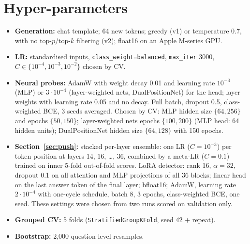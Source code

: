 \documentclass[11pt]{article}
\begin{document}
\section{Hyper-parameters}
\begin{itemize}
  \item \textbf{Generation:} chat template; 64 new tokens; greedy (v1) or temperature 0.7, with no top-$p$/top-$k$ filtering (v2); float16 on an Apple M-series GPU.
  \item \textbf{LR:} standardised inputs, \texttt{class\_weight=balanced}, \texttt{max\_iter} 3000, $C \in \{10^{-4},10^{-3},10^{-2}\}$ chosen by CV.
  \item \textbf{Neural probes:} AdamW with weight decay 0.01 and learning rate $10^{-3}$ (MLP) or $3\cdot10^{-4}$ (layer-weighted nets, DualPositionNet) for the head; layer weights with learning rate 0.05 and no decay. Full batch, dropout 0.5, class-weighted BCE, 3 seeds averaged. Chosen by CV: MLP hidden size $\{64,256\}$ and epochs $\{50,150\}$; layer-weighted nets epochs $\{100,200\}$ (MLP head: 64 hidden units); DualPositionNet hidden size $\{64,128\}$ with 150 epochs.
  \item \textbf{Section~\ref{sec:push}:} stacked per-layer ensemble: one LR ($C=10^{-3}$) per token position at layers 14, 16, \dots, 36, combined by a meta-LR ($C=0.1$) trained on inner 5-fold out-of-fold scores. LoRA detector: rank 16, $\alpha=32$, dropout 0.1 on all attention and MLP projections of all 36 blocks; linear head on the last answer token of the final layer; bfloat16; AdamW, learning rate $2\cdot10^{-4}$ with one-cycle schedule, batch 8, 3 epochs, class-weighted BCE, one seed. These settings were chosen from two runs scored on validation only.
  \item \textbf{Grouped CV:} 5 folds (\texttt{StratifiedGroupKFold}, seed 42 + repeat).
  \item \textbf{Bootstrap:} 2,000 question-level resamples.
\end{itemize}
\end{document}
